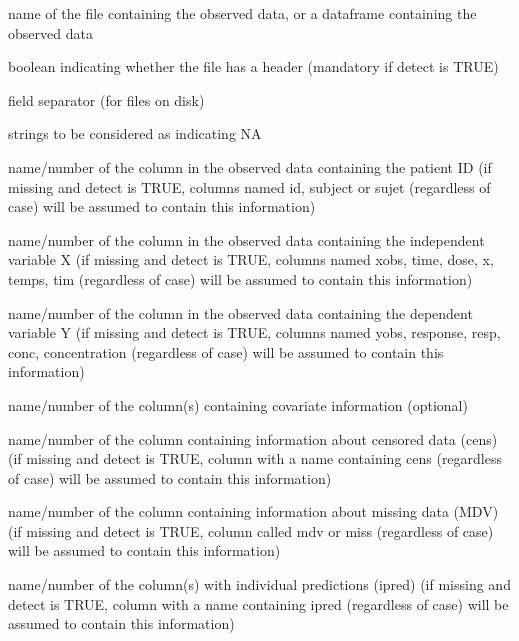 \documentclass[a4paper]{book}
\begin{document}
%
\begin{Arguments}
\begin{ldescription}
\item[\code{name.data}] name of the file containing the observed data, or a dataframe
containing the observed data

\item[\code{header}] boolean indicating whether the file has a header (mandatory if 
detect is TRUE)

\item[\code{sep}] field separator (for files on disk)

\item[\code{na.strings}] strings to be considered as indicating NA

\item[\code{name.group}] name/number of the column in the observed data containing the 
patient ID (if missing and detect is TRUE, columns named id, subject or sujet 
(regardless of case) will be assumed to contain this information)

\item[\code{name.predictor}] name/number of the column in the observed data containing 
the independent variable X (if missing and detect is TRUE, columns named xobs, 
time, dose, x, temps, tim (regardless of case) will be assumed to 
contain this information)

\item[\code{name.response}] name/number of the column in the observed data containing 
the dependent variable Y (if missing and detect is TRUE, columns named yobs, 
response, resp, conc, concentration (regardless of case) will be assumed to 
contain this information)

\item[\code{name.covariates}] name/number of the column(s) containing covariate 
information (optional)

\item[\code{name.cens}] name/number of the column containing information about censored 
data (cens) (if missing and detect is TRUE, column with a name containing cens 
(regardless of case) will be assumed to contain this information)

\item[\code{name.miss}] name/number of the column containing information about missing 
data (MDV) (if missing and detect is TRUE, column called mdv or miss 
(regardless of case) will be assumed to contain this information)

\item[\code{name.ipred}] name/number of the column(s) with individual predictions
(ipred)  (if missing and detect is TRUE, column with a name containing ipred 
(regardless of case) will be assumed to contain this information)


\end{ldescription}
\end{Arguments}
\end{document}
